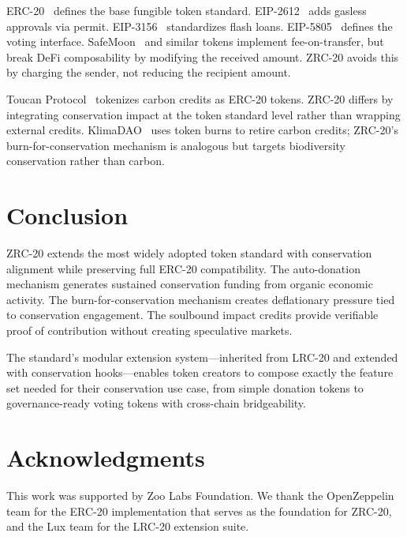 \documentclass[11pt,letterpaper]{article}
\begin{document}
ERC-20~\cite{erc20} defines the base fungible token standard. EIP-2612~\cite{eip2612} adds gasless approvals via permit. EIP-3156~\cite{eip3156} standardizes flash loans. EIP-5805~\cite{eip5805} defines the voting interface. SafeMoon~\cite{safemoon2021} and similar tokens implement fee-on-transfer, but break DeFi composability by modifying the received amount. ZRC-20 avoids this by charging the sender, not reducing the recipient amount.

Toucan Protocol~\cite{toucan2022} tokenizes carbon credits as ERC-20 tokens. ZRC-20 differs by integrating conservation impact at the token standard level rather than wrapping external credits. KlimaDAO~\cite{klima2021} uses token burns to retire carbon credits; ZRC-20's burn-for-conservation mechanism is analogous but targets biodiversity conservation rather than carbon.

\section{Conclusion}

ZRC-20 extends the most widely adopted token standard with conservation alignment while preserving full ERC-20 compatibility. The auto-donation mechanism generates sustained conservation funding from organic economic activity. The burn-for-conservation mechanism creates deflationary pressure tied to conservation engagement. The soulbound impact credits provide verifiable proof of contribution without creating speculative markets.

The standard's modular extension system---inherited from LRC-20 and extended with conservation hooks---enables token creators to compose exactly the feature set needed for their conservation use case, from simple donation tokens to governance-ready voting tokens with cross-chain bridgeability.

\section*{Acknowledgments}

This work was supported by Zoo Labs Foundation. We thank the OpenZeppelin team for the ERC-20 implementation that serves as the foundation for ZRC-20, and the Lux team for the LRC-20 extension suite.
\end{document}
